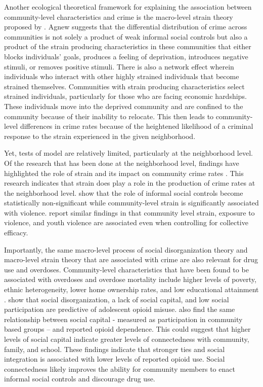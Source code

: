 Another ecological theoretical framework for explaining the association between community-level characteristics and crime is the macro-level strain theory proposed by \parencite{agnew_robert_general_1999}. Agnew suggests that the differential distribution of crime across communities is not solely a product of weak informal social controls but also a product of the strain producing characteristics in these communities that either blocks individuals’ goals, produces a feeling of deprivation, introduces negative stimuli, or removes positive stimuli. There is also a network effect wherein individuals who interact with other highly strained individuals that become strained themselves. Communities with strain producing characteristics select strained individuals, particularly for those who are facing economic hardships. These individuals move into the deprived community and are confined to the community because of their inability to relocate. This then leads to community-level differences in crime rates because of the heightened likelihood of a criminal response to the strain experienced in the given neighborhood.

Yet, tests of \textcite{agnew_robert_general_1999} model are relatively limited, particularly at the neighborhood level. Of the research that has been done at the neighborhood level, findings have highlighted the role of strain and its impact on community crime rates \parencite{antunes_social_2022, warner_strain_2003}. This research indicates that strain does play a role in the production of crime rates at the neighborhood level. \textcite{warner_strain_2003} show that the role of informal social controls become statistically non-significant while community-level strain is significantly associated with violence. \textcite{antunes_social_2022} report similar findings in that community level strain, exposure to violence, and youth violence are associated even when controlling for collective efficacy. 

Importantly, the same macro-level process of social disorganization theory and macro-level strain theory that are associated with crime are also relevant for drug use and overdoses. Community-level characteristics that have been found to be associated with overdoses and overdose mortality include higher levels of poverty, ethnic heterogeneity, lower home ownership rates, and low educational attainment \parencite{chichester_pharmacies_2020, galea_income_2003, hannon_neighborhood_2006, ford_neighborhood_2017}. \textcite{ford_neighborhood_2017} show that social disorganization, a lack of social capital, and low social participation are predictive of adolescent opioid misuse. \textcite{winstanley_association_2008} also find the same relationship between social capital - measured as participation in community based groups -- and reported opioid dependence. This could suggest that higher levels of social capital indicate greater levels of connectedness with community, family, and school. These findings indicate that stronger ties and social integration is associated with lower levels of reported opioid use. Social connectedness likely improves the ability for community members to enact informal social controls and discourage drug use. 

